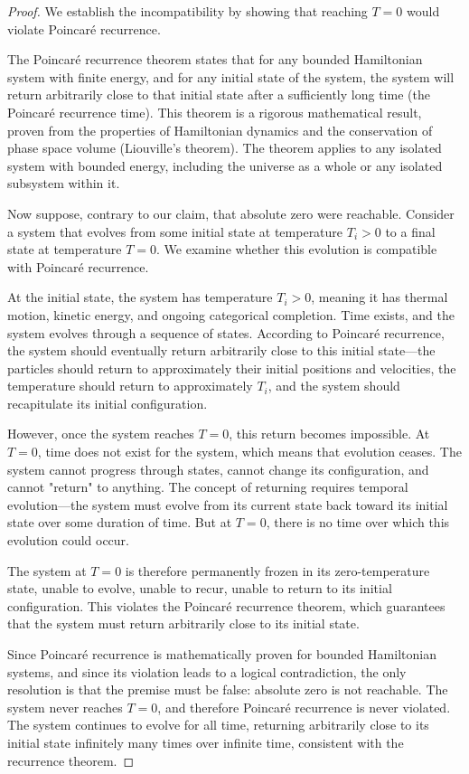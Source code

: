 \documentclass[12pt,a4paper]{article}
\theoremstyle{definition}
\theoremstyle{remark}
\begin{document}
\begin{proof}
We establish the incompatibility by showing that reaching $T = 0$ would violate Poincaré recurrence.

The Poincaré recurrence theorem states that for any bounded Hamiltonian system with finite energy, and for any initial state of the system, the system will return arbitrarily close to that initial state after a sufficiently long time (the Poincaré recurrence time). This theorem is a rigorous mathematical result, proven from the properties of Hamiltonian dynamics and the conservation of phase space volume (Liouville's theorem). The theorem applies to any isolated system with bounded energy, including the universe as a whole or any isolated subsystem within it.

Now suppose, contrary to our claim, that absolute zero were reachable. Consider a system that evolves from some initial state at temperature $T_i > 0$ to a final state at temperature $T = 0$. We examine whether this evolution is compatible with Poincaré recurrence.

At the initial state, the system has temperature $T_i > 0$, meaning it has thermal motion, kinetic energy, and ongoing categorical completion. Time exists, and the system evolves through a sequence of states. According to Poincaré recurrence, the system should eventually return arbitrarily close to this initial state—the particles should return to approximately their initial positions and velocities, the temperature should return to approximately $T_i$, and the system should recapitulate its initial configuration.

However, once the system reaches $T = 0$, this return becomes impossible. At $T = 0$, time does not exist for the system, which means that evolution ceases. The system cannot progress through states, cannot change its configuration, and cannot "return" to anything. The concept of returning requires temporal evolution—the system must evolve from its current state back toward its initial state over some duration of time. But at $T = 0$, there is no time over which this evolution could occur.

The system at $T = 0$ is therefore permanently frozen in its zero-temperature state, unable to evolve, unable to recur, unable to return to its initial configuration. This violates the Poincaré recurrence theorem, which guarantees that the system must return arbitrarily close to its initial state.

Since Poincaré recurrence is mathematically proven for bounded Hamiltonian systems, and since its violation leads to a logical contradiction, the only resolution is that the premise must be false: absolute zero is not reachable. The system never reaches $T = 0$, and therefore Poincaré recurrence is never violated. The system continues to evolve for all time, returning arbitrarily close to its initial state infinitely many times over infinite time, consistent with the recurrence theorem.
\end{proof}
\end{document}
